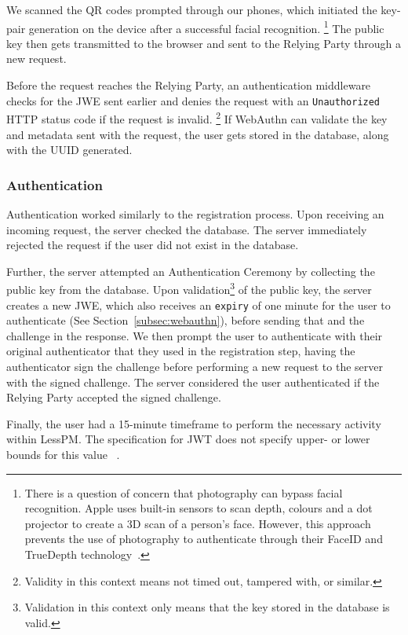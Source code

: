 We scanned the QR codes prompted through our phones, which initiated the
key-pair generation on the device after a successful facial recognition.
\footnote{
  There is a question of concern that photography can bypass facial recognition.
  Apple uses built-in sensors to scan depth, colours and a dot projector to
  create a 3D scan of a person's face.
  However, this approach prevents the use of photography to authenticate through
  their FaceID and TrueDepth technology~\cite{apple-support}.
}
The public key then gets transmitted to the browser and sent to the Relying
Party through a new request.

Before the request reaches the Relying Party, an authentication middleware
checks for the JWE sent earlier and denies the request with an
\texttt{Unauthorized} HTTP status code if the request is invalid.
\footnote{
  Validity in this context means not timed out, tampered with, or similar.
}
If WebAuthn can validate the key and metadata sent with the request, the user
gets stored in the database, along with the UUID generated.

\subsubsection{Authentication}\label{subsubsec:metho-authentication}
Authentication worked similarly to the registration process.
Upon receiving an incoming request, the server checked the database.
The server immediately rejected the request if the user did not exist in the
database.

Further, the server attempted an Authentication Ceremony by collecting the
public key from the database.
Upon validation\footnote{
  Validation in this context only means that the key stored in the database is
  valid.
} of the public key, the server creates a new JWE, which also receives an
\texttt{expiry} of one minute for the user to authenticate (See
Section~\ref{subsec:webauthn}), before sending that and the challenge in the
response.
We then prompt the user to authenticate with their original authenticator
that they used in the registration step, having the authenticator sign the
challenge before performing a new request to the server with the signed
challenge.
The server considered the user authenticated if the Relying Party accepted the
signed challenge.

Finally, the user had a 15-minute timeframe to perform the necessary activity
within LessPM\@.
The specification for JWT does not specify upper- or lower bounds for this
value ~\cite{RFC7519}.


